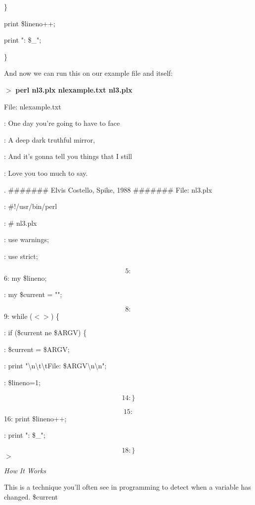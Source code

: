 \documentclass[a4paper,11pt]{book}
\begin{document}
\noindent \}

\noindent 

\noindent print \$lineno++;

\noindent print ": \$\_";

\noindent \}

\noindent 

\noindent And now we can run this on our example file and itself:

\noindent 

\noindent $>$ \textbf{perl nl3.plx nlexample.txt nl3.plx}

\noindent 

\noindent File: nlexample.txt

\noindent 

: One day you're going to have to face

: A deep dark truthful mirror,

: And it's gonna tell you things that I still

: Love you too much to say.

. \#\#\#\#\#\#\# Elvis Costello, Spike, 1988 \#\#\#\#\#\#\# File: nl3.plx

: \#!/usr/bin/perl

: \# nl3.plx

: use warnings;

: use strict;

\[5:\] 
6: my \$lineno;

: my \$current = "";

\[8:\] 
9: while ($<$$>$) \{

: if (\$current ne \$ARGV) \{

: \$current = \$ARGV;

: print "\textbackslash n\textbackslash t\textbackslash tFile: \$ARGV\textbackslash n\textbackslash n";

: \$lineno=1;

\[14: \}\] 

\[15:\] 
16: print \$lineno++;

: print ": \$\_";

\[18: \}\] 
$>$

\noindent 

\noindent 

\noindent \textit{How It Works}

\noindent This is a technique you'll often see in programming to detect when a variable has changed. \$current
\end{document}
